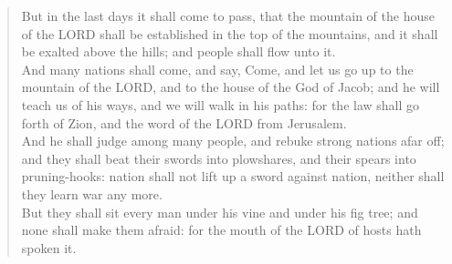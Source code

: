 \documentclass[MAIN]{subfiles}
\begin{document}
\begin{verse}
But in the last days it shall come to pass, that the mountain of the house of the {\hge LORD} shall be established in the top of the mountains, and it shall be exalted above the hills; and people shall flow unto it.\\
And many nations shall come, and say, Come, and let us go up to the mountain of the {\hge LORD}, and to the house of the God of Jacob; and he will teach us of his ways, and we will walk in his paths: for the law shall go forth of {\sc Zion}, and the word of the {\hge LORD} from {\sc Jerusalem}.\\
And he shall judge among many people, and rebuke strong nations afar off; and they shall beat their swords into plowshares, and their spears into pruning-hooks: nation shall not lift up a sword against nation, neither shall they learn war any more.\\
But they shall sit every man under his vine and under his fig tree; and none shall make them afraid: for the mouth of the {\hge LORD} of hosts hath spoken it.
\end{verse}
\end{document}

